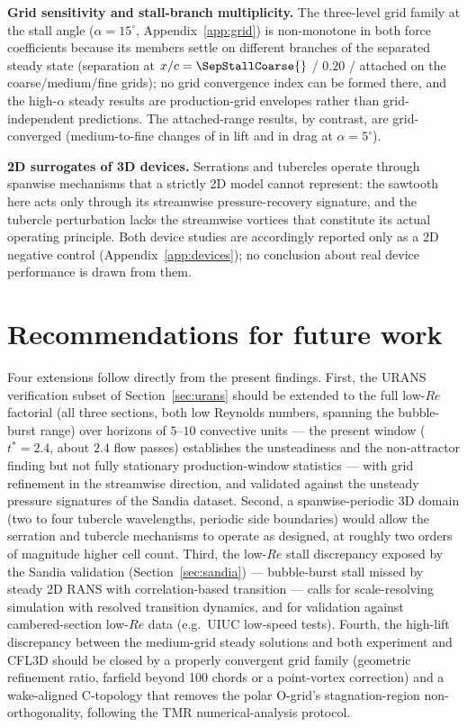 \documentclass[11pt,a4paper]{article}
\begin{document}
\textbf{Grid sensitivity and stall-branch multiplicity.} The three-level grid family at the stall angle ($\alpha = 15^\circ$, Appendix~\ref{app:grid}) is non-monotone in both force coefficients because its members settle on different branches of the separated steady state (separation at $x/c = \SepStallCoarse{}$ / $0.20$ / attached on the coarse/medium/fine grids); no grid convergence index can be formed there, and the high-$\alpha$ steady results are production-grid envelopes rather than grid-independent predictions. The attached-range results, by contrast, are grid-converged (medium-to-fine changes of \ClGridDelta{} in lift and \CdGridDelta{} in drag at $\alpha = 5^\circ$).

\textbf{2D surrogates of 3D devices.} Serrations and tubercles operate through spanwise mechanisms that a strictly 2D model cannot represent: the sawtooth here acts only through its streamwise pressure-recovery signature, and the tubercle perturbation lacks the streamwise vortices that constitute its actual operating principle. Both device studies are accordingly reported only as a 2D negative control (Appendix~\ref{app:devices}); no conclusion about real device performance is drawn from them.

\section{Recommendations for future work}
Four extensions follow directly from the present findings. First, the URANS verification subset of Section~\ref{sec:urans} should be extended to the full low-$Re$ factorial (all three sections, both low Reynolds numbers, spanning the bubble-burst range) over horizons of $5$--$10$ convective units --- the present window ($t^* = 2.4$, about $2.4$ flow passes) establishes the unsteadiness and the non-attractor finding but not fully stationary production-window statistics --- with grid refinement in the streamwise direction, and validated against the unsteady pressure signatures of the Sandia dataset. Second, a spanwise-periodic 3D domain (two to four tubercle wavelengths, periodic side boundaries) would allow the serration and tubercle mechanisms to operate as designed, at roughly two orders of magnitude higher cell count. Third, the low-$Re$ stall discrepancy exposed by the Sandia validation (Section~\ref{sec:sandia}) --- bubble-burst stall missed by steady 2D RANS with correlation-based transition --- calls for scale-resolving simulation with resolved transition dynamics, and for validation against cambered-section low-$Re$ data (e.g.\ UIUC low-speed tests). Fourth, the high-lift discrepancy between the medium-grid steady solutions and both experiment and CFL3D should be closed by a properly convergent grid family (geometric refinement ratio, farfield beyond 100 chords or a point-vortex correction) and a wake-aligned C-topology that removes the polar O-grid's stagnation-region non-orthogonality, following the TMR numerical-analysis protocol.
\end{document}
